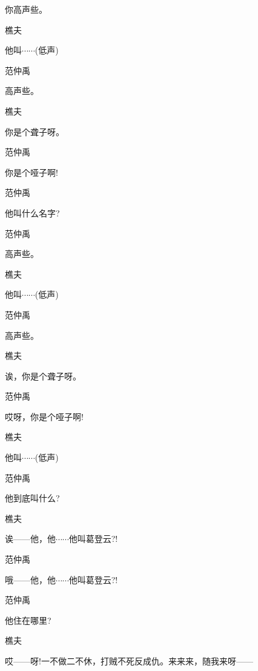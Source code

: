 你高声些。

樵夫\hspace{30pt}~

他叫$\cdots{}\cdots{}$(低声)

范仲禹\hspace{20pt}~

高声些。

樵夫\hspace{30pt}~

你是个聋子呀。

范仲禹\hspace{20pt}~

你是个哑子啊!

范仲禹\hspace{20pt}~

他叫什么名字?

范仲禹\hspace{20pt}~

高声些。

樵夫\hspace{30pt}~

他叫$\cdots{}\cdots{}$(低声)

范仲禹\hspace{20pt}~

高声些。

樵夫\hspace{30pt}~

诶，你是个聋子呀。

范仲禹\hspace{20pt}~

哎呀，你是个哑子啊!

樵夫\hspace{30pt}~

他叫$\cdots{}\cdots{}$(低声)

范仲禹\hspace{20pt}~

他到底叫什么?

樵夫\hspace{30pt}~

诶------他，他$\cdots{}\cdots{}$他叫葛登云?!

范仲禹\hspace{20pt}~

哦------他，他$\cdots{}\cdots{}$他叫葛登云?!

范仲禹\hspace{20pt}~

他住在哪里?

樵夫\hspace{30pt}~

哎------呀!一不做二不休，打贼不死反成仇。来来来，随我来呀------

